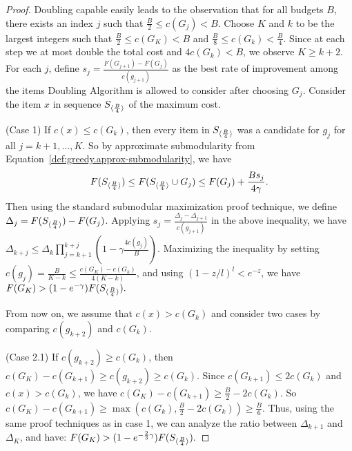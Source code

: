 \begin{proof}
Doubling capable easily leads to the observation that for all budgets $B$, there exists an index $j$ such that
$\frac{B}{2} \leq c(G_j) < B$.
Choose $K$ and $k$ to be  the largest integers such that
$\frac{B}{2} \leq c(G_K) < B$ and 
$\frac{B}{8} \leq c(G_k) < \frac{B}{4}$. Since at each step we at most double the 
total cost and $4c(G_k) < B$, we observe $K \geq k+2$. 
For each $j$, define $s_j = \frac{F(G_{j+1}) - F(G_{j})}{c(g_{j+1})}$ as the best 
rate of improvement among the items Doubling Algorithm is allowed to consider
after choosing $G_j$. 
Consider the item $x$ in sequence $S_{\langle \frac{B}{4} \rangle}$ of the maximum cost. 

(Case 1) If $c(x) \leq c(G_k)$, then
every item in $S_{\langle \frac{B}{4} \rangle}$ was a candidate for $g_{j}$ for all $j=k+1,..., K$. 
So by approximate submodularity from Equation~\ref{def:greedy.approx-submodularity}, we have 
\begin{align}
\label{eq:sub-additive}
F(S_{\langle \frac{B}{4} \rangle}) \leq F(S_{\langle \frac{B}{4} \rangle} \cup G_{j}) \leq F(G_j) + \frac{B s_j}{4 \gamma}.
\end{align}
Then using the standard submodular maximization proof technique, we define
\mbox{$\Delta _j = F(S_{\langle \frac{B}{4} \rangle}) - F(G_j)$}. Applying $s_j = \frac{\Delta _{j} - \Delta_{j+1}}{c(g_{j+1})}$ in the above inequality, 
we have
\mbox{$\Delta _{k+j} \leq \Delta_k \prod _{j=k+1}^{k+j} ( 1 - \gamma \frac{ 4 c(g_{j})}{B})$}. Maximizing the 
inequality by setting $c(g_{j}) = \frac{B}{K-k} \leq \frac{c(G_K) - c(G_k)}{4 (K-k)}$, 
and using $(1- z/l)^l < e^{-z}$, we have 
\mbox{$F(G_K) > (1 - e^{-\gamma}) F(S_{\langle \frac{B}{4} \rangle}).
$}

From now on, we assume that $c(x) > c(G_k)$ and consider 
two cases by comparing $c(g_{k+2})$ and $c(G_{k})$. 

(Case 2.1) If $c(g_{k+2}) \geq c(G_{k})$, then 
$c(G_K) - c(G_{k+1}) \geq c(g_{k+2}) \geq c(G_k)$. 
Since $c(G_{k+1}) \leq 2 c(G_k)$ and $c(x) > c(G_k)$, 
we have $c(G_K) - c(G_{k+1}) \geq \frac{B}{2} - 2c(G_k)$.
So \mbox{$c(G_K) - c(G_{k+1}) \geq \max ( c(G_k), \frac{B}{2} - 2c(G_k) ) \geq \frac{B}{6}$}. 
Thus, using the same proof techniques as in case 1, we can analyze the ratio between $\Delta_{k+1}$ and $\Delta_K$, and have:
\mbox{$
F(G_K) > (1 - e^{-\frac{2}{3} \gamma}) F(S_{\langle \frac{B}{4} \rangle}).
$}


\end{proof}
